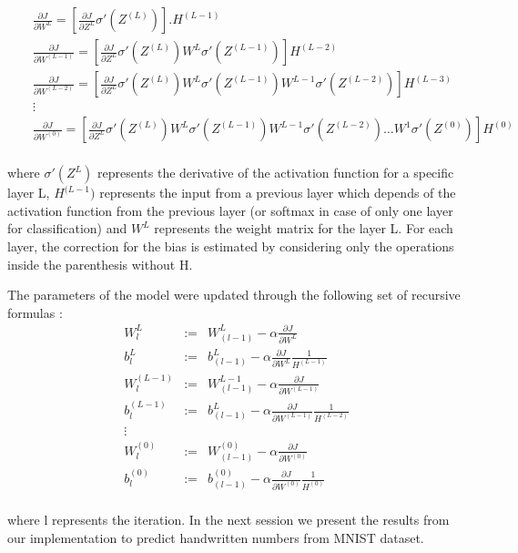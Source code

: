 \documentclass{article}
\begin{document}
\begin{eqnarray}
&&\frac{\partial{J}}{\partial{W^L}} = \left[\frac{\partial{J}}{\partial{Z^L}}\sigma'(Z^{(L)})\right].H^{(L-1)}\\
&&\frac{\partial{J}}{\partial{W^{(L-1)}}} =\left[ \frac{\partial{J}}{\partial{Z^L}}\sigma'(Z^{(L)}) W^{L}\sigma'(Z^{(L-1)})\right]H^{(L-2)}\\
&&\frac{\partial{J}}{\partial{W^{(L-2)}}} =\left[ \frac{\partial{J}}{\partial{Z^L}}\sigma'(Z^{(L)}) W^{L}\sigma'(Z^{(L-1)}) W^{L-1}\sigma'(Z^{(L-2)})\right]H^{(L-3)}\\
&&\vdots \nonumber \\
&&\frac{\partial{J}}{\partial{W^{(0)}}} =\left[ \frac{\partial{J}}{\partial{Z^L}}\sigma'(Z^{(L)}) W^{L}\sigma'(Z^{(L-1)}) W^{L-1}\sigma'(Z^{(L-2)})\hdots W^1\sigma'(Z^{(0)}) \right] H^{(0)} \nonumber \\
\label{der2}
\end{eqnarray}

where $\sigma'(Z^L)$ represents the derivative of the activation function for a specific layer L, $H^{(L-1})$ represents the input from a previous layer which depends of the activation function from the previous layer (or softmax in case of only one layer for classification) and $W^L$ represents the weight matrix for the layer L. For each layer, the correction for the bias is estimated by considering only the operations inside the parenthesis without H.

The parameters of the model were updated through the following set of recursive formulas :
\begin{eqnarray}
W_l^L&:=&W_{(l-1)}^L -  \alpha \frac{\partial{J}}{\partial{W^L}}  \\
b_l^L&:=&b_{(l-1)}^L -  \alpha \frac{\partial{J}}{\partial{W^L}}\frac{1}{H^{(L-1)}}  \\
W_l^{(L-1)}&:=&W_{(l-1)}^{L-1} -  \alpha \frac{\partial{J}}{\partial{W^{(L-1)}}}  \\
b_l^{(L-1)}&:=&b_{(l-1)}^L -  \alpha \frac{\partial{J}}{\partial{W^{(L-1)}}} \frac{1}{H^{(L-2)}} \\ 
\vdots \nonumber \\
W_l^{(0)}&:=&W_{(l-1)}^{(0)} -  \alpha \frac{\partial{J}}{\partial{W^{(0)}}} \nonumber \\
b_l^{(0)}&:=&b_{(l-1)}^{(0)} -  \alpha \frac{\partial{J}}{\partial{W^{(0)}}} \frac{1}{H^{(0)}}  \nonumber \\
\end{eqnarray}

where l represents the iteration. In the next session we present the results from our implementation to predict handwritten numbers from MNIST dataset.
\end{document}
